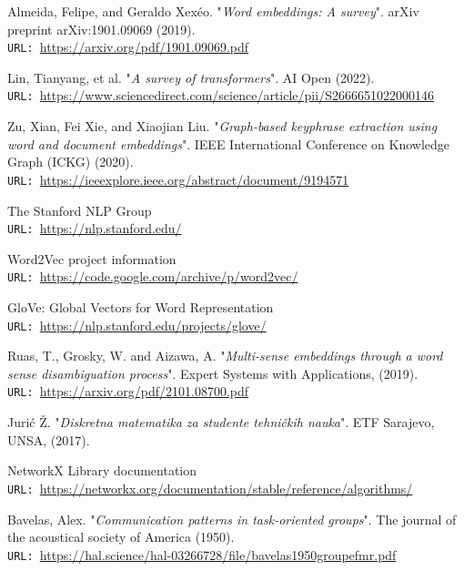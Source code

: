 \documentclass[12pt]{article}
\numberwithin{equation}{section}
\begin{document}
\begin{spacing}{1.5}
	\begin{thebibliography}{8}
		Almeida, Felipe, and Geraldo Xexéo. "\textit{Word embeddings: A survey}". arXiv preprint arXiv:1901.09069 (2019). \\
		\texttt{URL: }\url{https://arxiv.org/pdf/1901.09069.pdf}
		
		Lin, Tianyang, et al. "\textit{A survey of transformers}". AI Open (2022).\\
		\texttt{URL: }\url{https://www.sciencedirect.com/science/article/pii/S2666651022000146}
		
		Zu, Xian, Fei Xie, and Xiaojian Liu. "\textit{Graph-based keyphrase extraction using word and document embeddings}". IEEE International Conference on Knowledge Graph (ICKG) (2020). \\
		\texttt{URL: }\url{https://ieeexplore.ieee.org/abstract/document/9194571}
		
		The Stanford NLP Group\\
		\texttt{URL: }\url{https://nlp.stanford.edu/}
		
		Word2Vec project information\\
		\texttt{URL: }\url{https://code.google.com/archive/p/word2vec/}
		
		GloVe: Global Vectors for Word Representation\\
		\texttt{URL: }\url{https://nlp.stanford.edu/projects/glove/}
		
		Ruas, T., Grosky, W. and Aizawa, A.  "\textit{Multi-sense embeddings through a word sense disambiguation process}". Expert Systems with Applications,  (2019). \\
		\texttt{URL: }\url{https://arxiv.org/pdf/2101.08700.pdf}
		
		Jurić Ž. "\textit{Diskretna matematika za studente tehničkih nauka}". ETF Sarajevo, UNSA, (2017). 
		
		NetworkX Library documentation\\
		\texttt{URL: }\url{https://networkx.org/documentation/stable/reference/algorithms/}
		
		Bavelas, Alex. "\textit{Communication patterns in task‐oriented groups}". The journal of the acoustical society of America (1950). \\
		\texttt{URL: }\url{https://hal.science/hal-03266728/file/bavelas1950groupefmr.pdf}
		

\end{thebibliography}
\end{spacing}
\end{document}
